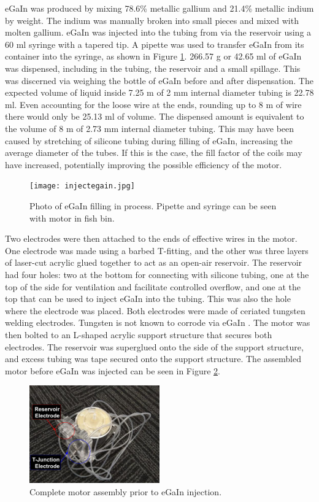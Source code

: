 \documentclass[a4paper,12pt]{article}
\begin{document}
eGaIn was produced by mixing 78.6\% metallic gallium and 21.4\% metallic indium by weight. The indium was manually broken into small pieces and mixed with molten gallium. eGaIn was injected into the tubing from via the reservoir using a 60 ml syringe with a tapered tip. A pipette was used to transfer eGaIn from its container into the syringe, as shown in Figure \ref{fg:injectsyringe}. 266.57 g or 42.65 ml of eGaIn was dispensed, including in the tubing, the reservoir and a small spillage. This was discerned via weighing the bottle of eGaIn before and after dispensation. The expected volume of liquid inside 7.25 m of 2 mm internal diameter tubing is 22.78 ml. Even accounting for the loose wire at the ends, rounding up to 8 m of wire there would only be 25.13 ml of volume. The dispensed amount is equivalent to the volume of 8 m of 2.73 mm internal diameter tubing. This may have been caused by stretching of silicone tubing during filling of eGaIn, increasing the average diameter of the tubes. If this is the case, the fill factor of the coils may have increased, potentially improving the possible efficiency of the motor.

\begin{figure}[h!]
    \centering
    \texttt{[image: injectegain.jpg]}
    \caption{Photo of eGaIn filling in process. Pipette and syringe can be seen with motor in fish bin.}
    \label{fg:injectsyringe}
\end{figure}

Two electrodes were then attached to the ends of effective wires in the motor. One electrode was made using a barbed T-fitting, and the other was three layers of laser-cut acrylic glued together to act as an open-air reservoir. The reservoir had four holes: two at the bottom for connecting with silicone tubing, one at the top of the side for ventilation and facilitate controlled overflow, and one at the top that can be used to inject eGaIn into the tubing. This was also the hole where the electrode was placed. Both electrodes were made of ceriated tungsten welding electrodes. Tungsten is not known to corrode via eGaIn \cite{indiumcorporationPRODUCTDATASHEET2019}. The motor was then bolted to an L-shaped acrylic support structure that secures both electrodes. The reservoir was superglued onto the side of the support structure, and excess tubing was tape secured onto the support structure. The assembled motor before eGaIn was injected can be seen in Figure \ref{fg:jignoegain}.

\begin{figure}[h!]
    \centering
    \includegraphics[width=0.5\textwidth]{jignoegain.png}
    \caption{Complete motor assembly prior to eGaIn injection.}
    \label{fg:jignoegain}
\end{figure}
\end{document}
